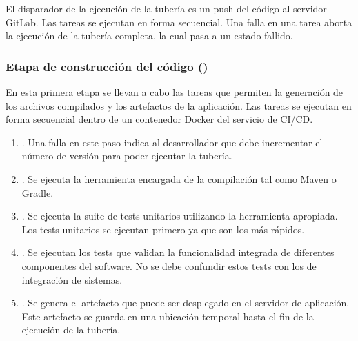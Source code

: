 El disparador de la ejecución de la tubería es un push del código al
servidor GitLab. Las tareas se ejecutan en forma secuencial. Una falla
en una tarea aborta la ejecución de la tubería completa, la cual pasa
a un estado fallido.
%
\subsubsection{Etapa de construcción del código ()}
%
En esta primera etapa se llevan a cabo las tareas que permiten la
generación de los archivos compilados y los artefactos de la
aplicación. Las tareas se ejecutan en forma secuencial dentro de un
contenedor Docker del servicio de CI/CD.
%
\begin{enumerate}
\item {}. Una falla
  en este paso indica al desarrollador que debe incrementar el número
  de versión para poder ejecutar la tubería.
\item {}. Se ejecuta la herramienta
  encargada de la compilación tal como Maven o Gradle.
\item {}. Se ejecuta la suite de tests
  unitarios utilizando la herramienta apropiada. Los tests unitarios
  se ejecutan primero ya que son los más rápidos.
\item {}. Se ejecutan los tests que
  validan la funcionalidad integrada de diferentes componentes del
  software. No se debe confundir estos tests con los de integración de
  sistemas.
\item {}. Se genera el artefacto que puede
  ser desplegado en el servidor de aplicación. Este artefacto se
  guarda en una ubicación temporal hasta el fin de la ejecución de la
  tubería.
\end{enumerate}
%
